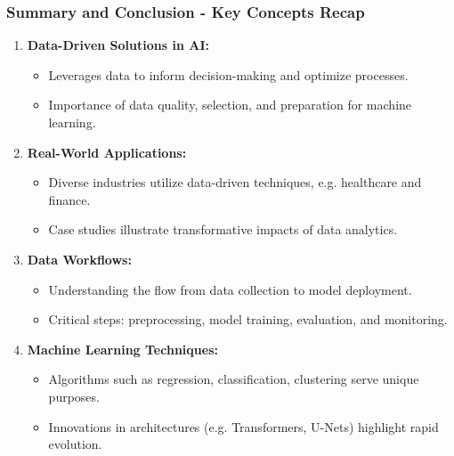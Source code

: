 \documentclass[aspectratio=169]{beamer}
\begin{document}
\begin{frame}[fragile]
    \frametitle{Summary and Conclusion - Key Concepts Recap}
    \begin{enumerate}
        \item \textbf{Data-Driven Solutions in AI:}
        \begin{itemize}
            \item Leverages data to inform decision-making and optimize processes.
            \item Importance of data quality, selection, and preparation for machine learning.
        \end{itemize}
        
        \item \textbf{Real-World Applications:}
        \begin{itemize}
            \item Diverse industries utilize data-driven techniques, e.g. healthcare and finance.
            \item Case studies illustrate transformative impacts of data analytics.
        \end{itemize}

        \item \textbf{Data Workflows:}
        \begin{itemize}
            \item Understanding the flow from data collection to model deployment.
            \item Critical steps: preprocessing, model training, evaluation, and monitoring.
        \end{itemize}

        \item \textbf{Machine Learning Techniques:}
        \begin{itemize}
            \item Algorithms such as regression, classification, clustering serve unique purposes.
            \item Innovations in architectures (e.g. Transformers, U-Nets) highlight rapid evolution.
        \end{itemize}
    \end{enumerate}
\end{frame}
\end{document}
